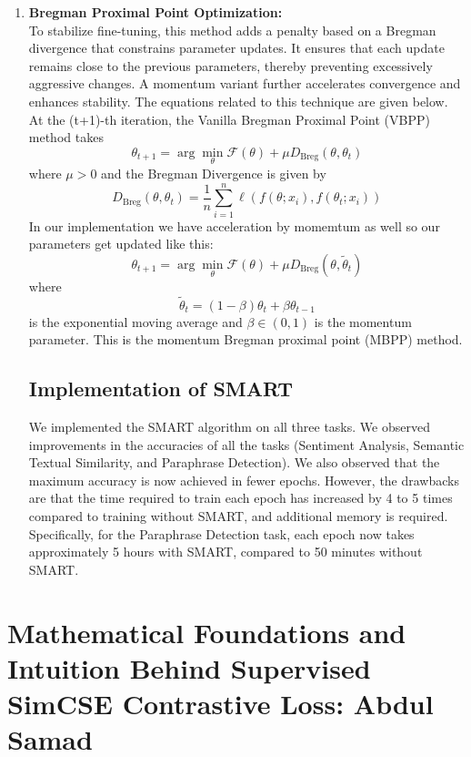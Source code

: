 \begin{enumerate}
  \item \textbf{Bregman Proximal Point Optimization:} \\[0.5em]
  To stabilize fine-tuning, this method adds a penalty based on a Bregman divergence that constrains parameter updates. It ensures that each update remains close to the previous parameters, thereby preventing excessively aggressive changes. A momentum variant further accelerates convergence and enhances stability.
  The equations related to this technique are given below. At the (t+1)-th iteration, the Vanilla Bregman Proximal Point (VBPP) method takes
    \[
    \theta_{t+1} = \arg\min_{\theta} \mathcal{F}(\theta) + \mu D_{\mathrm{Breg}}(\theta, \theta_t)
    \]
    where $\mu>0$ and the Bregman Divergence is given by
    \[
    D_{\mathrm{Breg}}(\theta, \theta_t) = \frac{1}{n} \sum_{i=1}^n \ell(f(\theta; x_i), f(\theta_t; x_i))
    \]
    In our implementation we have acceleration by momemtum as well so our parameters get updated like this:
    \[
    \theta_{t+1} = \arg\min_{\theta} \mathcal{F}(\theta) + \mu D_{\mathrm{Breg}}(\theta, \tilde{\theta}_t)
    \]
    where
    \[
    \tilde{\theta}_t = (1 - \beta) \theta_t + \beta \theta_{t-1}
    \]
    is the exponential moving average and $\beta \in (0, 1)$ is the momentum parameter. This is  the momentum Bregman proximal point (MBPP)
    method.

\subsection{Implementation of SMART}

We implemented the SMART algorithm on all three tasks. We observed improvements in the accuracies of all the tasks (Sentiment Analysis, Semantic Textual Similarity, and Paraphrase Detection). We also observed that the maximum accuracy is now achieved in fewer epochs. However, the drawbacks are that the time required to train each epoch has increased by 4 to 5 times compared to training without SMART, and additional memory is required. Specifically, for the Paraphrase Detection task, each epoch now takes approximately 5 hours with SMART, compared to 50 minutes without SMART.

\end{enumerate}
\section{Mathematical Foundations and Intuition Behind Supervised SimCSE Contrastive Loss: Abdul Samad}
